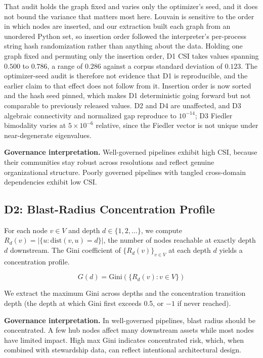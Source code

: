 \documentclass[11pt,a4paper]{article}
\begin{document}
That audit holds the graph fixed and varies only the optimizer's seed,
and it does not bound the variance that matters most here. Louvain is
sensitive to the order in which nodes are inserted, and our extraction
built each graph from an unordered Python set, so insertion order
followed the interpreter's per-process string hash randomization rather
than anything about the data. Holding one graph fixed and permuting only
the insertion order, D1 CSI takes values spanning $0.500$ to $0.786$,
a range of $0.286$ against a corpus standard deviation of $0.123$. The
optimizer-seed audit is therefore not evidence that D1 is reproducible,
and the earlier claim to that effect does not follow from it. Insertion
order is now sorted and the hash seed pinned, which makes D1
deterministic going forward but not comparable to previously released
values. D2 and D4 are unaffected, and D3 algebraic connectivity and
normalized gap reproduce to $10^{-14}$; D3 Fiedler bimodality varies at
$5 \times 10^{-6}$ relative, since the Fiedler vector is not unique
under near-degenerate eigenvalues.

\textbf{Governance interpretation.} Well-governed pipelines exhibit
high CSI, because their communities stay robust across resolutions and
reflect genuine organizational structure. Poorly governed pipelines
with tangled cross-domain dependencies exhibit low CSI.

\subsection{D2: Blast-Radius Concentration Profile}

For each node $v \in V$ and depth $d \in \{1, 2, \ldots\}$, we compute
$R_d(v) = |\{u : \text{dist}(v, u) = d\}|$, the number of nodes
reachable at exactly depth $d$ downstream. The Gini coefficient of
$\{R_d(v)\}_{v \in V}$ at each depth $d$ yields a concentration profile.

\begin{equation}
  G(d) = \text{Gini}(\{R_d(v) : v \in V\})
\end{equation}

We extract the maximum Gini across depths and the concentration
transition depth (the depth at which Gini first exceeds 0.5, or $-1$ if
never reached).

\textbf{Governance interpretation.} In well-governed pipelines, blast
radius should be concentrated. A few hub nodes affect many downstream
assets while most nodes have limited impact. High max Gini indicates
concentrated risk, which, when combined with stewardship data, can
reflect intentional architectural design.
\end{document}

